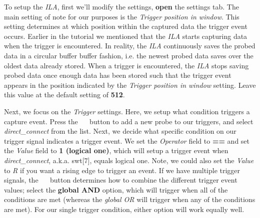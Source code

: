 \documentclass[11pt]{article}
\begin{document}
To setup the \textit{ILA}, first we'll modify the settings, \textbf{open} the settings tab. The main setting of note for our purposes is the \textit{Trigger position in window}. This setting determines at which position within the captured data the trigger event occurs. Earlier in the tutorial we mentioned that the \textit{ILA} starts capturing data when the trigger is encountered. In reality, the \textit{ILA} continuously saves the probed data in a circular buffer buffer fashion, i.e. the newest probed data saves over the oldest data already stored. When a trigger is encountered, the \textit{ILA} stops saving probed data once enough data has been stored such that the trigger event appears in the position indicated by the \textit{Trigger position in window} setting. Leave this value at the default setting of \textbf{512}.

Next, we focus on the \textit{Trigger} settings. Here, we setup what condition triggers a capture event. Press the 
~~
button to add a new probe to our triggers, and select \textit{direct\_connect} from the list. Next, we decide what specific condition on our trigger signal indicates a trigger event. We set the \textit{Operator} field to \textbf{==} and set the \textit{Value} field to \textbf{1 (logical one)}, which will setup a trigger event when \textit{direct\_connect}, a.k.a. swt[7], equals logical one. Note, we could also set the \textit{Value} to \textit{R} if you want a rising edge to trigger an event. If we have multiple trigger signals, the
~~
button determines how to combine the different trigger event values; select the \textbf{global AND} option, which will trigger when all of the conditions are met (whereas the \textit{global OR} will trigger when any of the conditions are met). For our single trigger condition, either option will work equally well.
\end{document}
